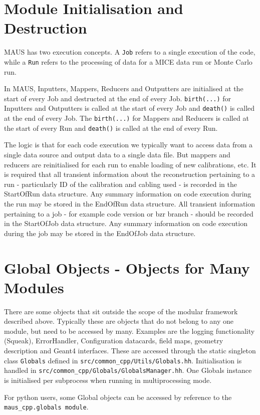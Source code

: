 \section{Module Initialisation and Destruction}
MAUS has two execution concepts. A \verb|Job| refers to a single execution of the code, while a \verb|Run| refers to the processing of data for a MICE data run or Monte Carlo run.

In MAUS, Inputters, Mappers, Reducers and Outputters are initialised at the start of every Job and destructed at the end of every Job. \verb|birth(...)| for Inputters and Outputters is called at the start of every Job and \verb|death()| is called at the end of every Job. The \verb|birth(...)| for Mappers and Reducers is called at the start of every Run and \verb|death()| is called at the end of every Run.

The logic is that for each code execution we typically want to access data from a single data source and output data to a single data file. But mappers and reducers are reinitialised for each run to enable loading of new calibrations, etc. It is required that all transient information about the reconstruction pertaining to a run - particularly ID of the calibration and cabling used - is recorded in the StartOfRun data structure. Any summary information on code execution during the run may be stored in the EndOfRun data structure. All transient information pertaining to a job - for example code version or bzr branch - should be recorded in the StartOfJob data structure. Any summary information on code execution during the job may be stored in the EndOfJob data structure.

\section{Global Objects - Objects for Many Modules}
There are some objects that sit outside the scope of the modular framework described above. Typically these are objects that do not belong to any one module, but need to be accessed by many. Examples are the logging functionality (Squeak), ErrorHandler, Configuration datacards, field maps, geometry description and Geant4 interfaces. These are accessed through the static singleton class \verb|Globals| defined in \verb|src/common_cpp/Utils/Globals.hh|. Initialisation is handled in \verb|src/common_cpp/Globals/GlobalsManager.hh|. One Globals instance is initialised per subprocess when running in multiprocessing mode.

For python users, some Global objects can be accessed by reference to the \verb|maus_cpp.globals module|.

